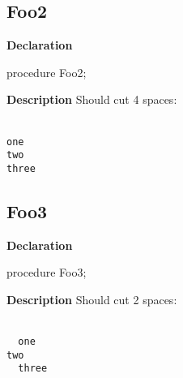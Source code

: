 \documentclass{report}
\begin{document}
\subsection*{Foo2}
\begin{list}{}{
\setlength{\itemindent}{0cm}
\setlength{\listparindent}{0cm}
\setlength{\leftmargin}{\evensidemargin}
\addtolength{\leftmargin}{\tmplength}
\settowidth{\labelsep}{X}
\addtolength{\leftmargin}{\labelsep}
\setlength{\labelwidth}{\tmplength}
}
\begin{flushleft}
\item[\textbf{Declaration}\hfill]
\begin{ttfamily}
procedure Foo2;\end{ttfamily}


\end{flushleft}
\par
\item[\textbf{Description}]
Should cut 4 spaces:

\texttt{\\\nopagebreak[3]
one\\\nopagebreak[3]
two\\\nopagebreak[3]
three\\
}

\end{list}
\subsection*{Foo3}
\begin{list}{}{
\setlength{\itemindent}{0cm}
\setlength{\listparindent}{0cm}
\setlength{\leftmargin}{\evensidemargin}
\addtolength{\leftmargin}{\tmplength}
\settowidth{\labelsep}{X}
\addtolength{\leftmargin}{\labelsep}
\setlength{\labelwidth}{\tmplength}
}
\begin{flushleft}
\item[\textbf{Declaration}\hfill]
\begin{ttfamily}
procedure Foo3;\end{ttfamily}


\end{flushleft}
\par
\item[\textbf{Description}]
Should cut 2 spaces:

\texttt{\\\nopagebreak[3]
~~one\\\nopagebreak[3]
two\\\nopagebreak[3]
~~three\\
}

\end{list}
\end{document}
